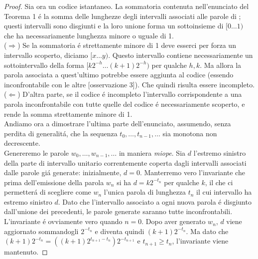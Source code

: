 \begin{proof}
    Sia ora  un codice istantaneo. La sommatoria contenuta nell'enunciato del Teorema 1 é la somma delle lunghezze degli intervalli associati alle parole di ; questi intervalli sono disgiunti e la loro unione forma un sottoinsieme di $[0\dots1)$ che ha necessariamente lunghezza minore o uguale di 1.\\
    ($\Longrightarrow$) Se la sommatoria é strettamente minore di 1 deve esserci per forza un intervallo scoperto, diciamo $[x \dots y)$. Questo intervallo contiene necessariamente un sottointervallo della forma $[k2^{-h} \dots (k + 1)2^{-h})$ per qualche $h, k$. Ma allora la parola associata a quest'ultimo potrebbe essere aggiunta al codice (essendo inconfrontabile con le altre [osservazione 3]). Che quindi risulta essere incompleto.\\
    ($\Longleftarrow$) D'altra parte, se il codice é incompleto l'intervallo corrispondente a una parola inconfrontabile con tutte quelle del codice é necessariamente scoperto, e rende la somma strettamente minore di 1.\\
    Andiamo ora a dimostrare l'ultima parte dell'enunciato, assumendo, senza perdita di generalitá, che la sequenza $t_0, \dots, t_{n - 1}, \dots$ sia monotona non decrescente.\\
    Genereremo le parole  $w_0, \dots, w_{n - 1}, \dots$ in maniera \textit{miope}. Sia $d$ l'estremo sinistro della parte di intervallo unitario correntemente coperta dagli intervalli associati dalle parole giá generate: inizialmente, $d = 0$. Manterremo vero l'invariante che prima dell'emissione della parola $w_n$ si ha $d = k2^{-t_n}$ per qualche $k$, il che ci permetterá di scegliere come $w_n$ l'unica parola di lunghezza $t_n$ il cui intervallo ha estremo sinistro $d$. Dato che l'intervallo associato a ogni nuova parola é disgiunto dall'unione dei precedenti, le parole generate saranno tutte inconfrontabili.\\
    L'invariante é ovviamente vero quando $n = 0$. Dopo aver generato $w_n$, $d$ viene aggiornato sommandogli $2^{-t_n}$ e diventa quindi $(k + 1)2^{-t_n}$. Ma dato che $(k + 1)2^{-t_n} = ((k + 1)2^{t_{n + 1}-t_n})2^{-t_{n + 1}}$ e $t_{n + 1} \geq t_n$, l'invariante viene mantenuto.
    \qedhere
\end{proof}
